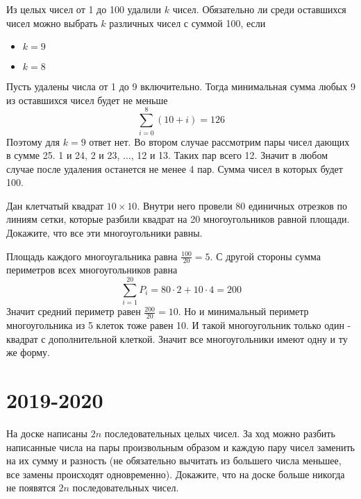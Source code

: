 \documentclass[11pt, a4paper]{template}
\begin{document}
\begin{exercise}
Из целых чисел от 1 до 100 удалили $k$ чисел. Обязательно ли среди оставшихся чисел можно выбрать $k$ различных чисел с суммой 100, если
\begin{itemize}
\item $k = 9$
\item $k = 8$
\end{itemize}
\end{exercise}

\begin{solution}
Пусть удалены числа от 1 до 9 включительно. Тогда минимальная сумма любых 9 из оставшихся чисел будет не меньше 
$$
\sum_{i = 0}^{8} (10 + i) = 126
$$
Поэтому для $k = 9$ ответ нет. Во втором случае рассмотрим пары чисел дающих в сумме 25. 1 и 24, 2 и 23, $\dots$, 12 и 13. Таких пар всего 12. Значит в любом случае после удаления останется не менее 4 пар. Сумма чисел в которых будет 100.
\end{solution}

\begin{exercise}
Дан клетчатый квадрат $10 \times 10$. Внутри него провели 80 единичных отрезков по линиям сетки, которые разбили квадрат на 20 многоугольников равной площади. Докажите, что все эти многоугольники равны.
\end{exercise}

\begin{solution}
Площадь каждого многоугальника равна $\frac{100}{20} = 5$. С другой стороны сумма периметров всех многоугольников равна
$$
\sum_{i=1}^{20} P_{i} = 80 \cdot 2 + 10 \cdot 4 = 200
$$
Значит средний периметр равен $\frac{200}{20} = 10$. Но и минимальный периметр многоугольника из 5 клеток тоже равен 10. И такой многоугольник только один - квадрат с дополнительной клеткой. Значит все многоугольники имеют одну и ту же форму.
\end{solution}

\chapter{2019-2020}

\begin{exercise}
На доске написаны $2n$ последовательных целых чисел. За ход можно разбить написанные числа на пары \newline произвольным образом и каждую пару чисел заменить на их сумму и разность (не обязательно вычитать из большего числа меньшее, все замены происходят одновременно). Докажите, что на доске больше никогда не появятся $2n$ последовательных чисел.
\end{exercise}
\end{document}
